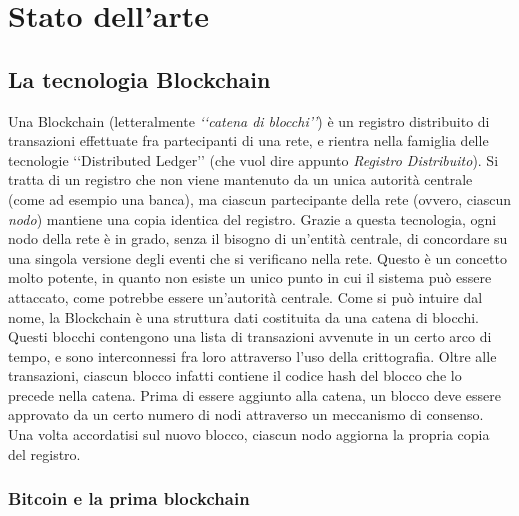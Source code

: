 \chapter{Stato dell'arte}
\lhead[\fancyplain{}{\bfseries\thepage}]{\fancyplain{}{\bfseries\rightmark}}
\section{La tecnologia Blockchain}
Una Blockchain (letteralmente \textit{‘‘catena di blocchi’’}) è un registro distribuito di transazioni effettuate fra partecipanti di una rete, e rientra nella famiglia delle tecnologie ‘‘Distributed Ledger’’ (che vuol dire appunto \textit{Registro Distribuito}). Si tratta di un registro che non viene mantenuto da un unica autorità centrale (come ad esempio una banca), ma ciascun partecipante della rete (ovvero, ciascun \textit{nodo}) mantiene una copia identica del registro. Grazie a questa tecnologia, ogni nodo della rete è in grado, senza il bisogno di un'entità centrale, di concordare su una singola versione degli eventi che si verificano nella rete. Questo è un concetto molto potente, in quanto non esiste un unico punto in cui il sistema può essere attaccato, come potrebbe essere un'autorità centrale. 
Come si può intuire dal nome, la Blockchain è una struttura dati costituita da una catena di blocchi. Questi blocchi contengono una lista di transazioni avvenute in un certo arco di tempo, e sono interconnessi fra loro attraverso l'uso della crittografia. Oltre alle transazioni, ciascun blocco infatti contiene il codice hash del blocco che lo precede nella catena. Prima di essere aggiunto alla catena, un blocco deve essere approvato da un certo numero di nodi attraverso un meccanismo di consenso. Una volta accordatisi sul nuovo blocco, ciascun nodo aggiorna la propria copia del registro.

\subsection{Bitcoin e la prima blockchain}

